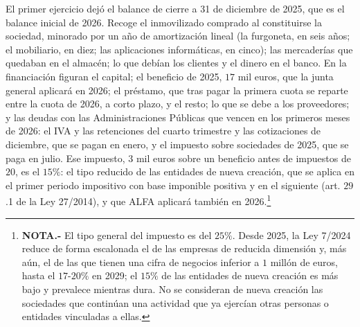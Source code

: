 \documentclass[10pt,a4paper]{article}
\begin{document}
El primer ejercicio dejó el balance de cierre a 31 de diciembre de 2025, que es el balance inicial de 2026. Recoge el inmovilizado comprado al constituirse la sociedad, minorado por un año de amortización lineal (la furgoneta, en seis años; el mobiliario, en diez; las aplicaciones informáticas, en cinco); las mercaderías que quedaban en el almacén; lo que debían los clientes y el dinero en el banco. En la financiación figuran el capital; el beneficio de 2025, $17$ mil euros, que la junta general aplicará en 2026; el préstamo, que tras pagar la primera cuota se reparte entre la cuota de 2026, a corto plazo, y el resto; lo que se debe a los proveedores; y las deudas con las Administraciones Públicas que vencen en los primeros meses de 2026: el IVA y las retenciones del cuarto trimestre y las cotizaciones de diciembre, que se pagan en enero, y el impuesto sobre sociedades de 2025, que se paga en julio. Ese impuesto, $3$ mil euros sobre un beneficio antes de impuestos de $20$, es el $15\%$: el tipo reducido de las entidades de nueva creación, que se aplica en el primer periodo impositivo con base imponible positiva y en el siguiente (art. $29$.1 de la Ley 27/2014), y que ALFA aplicará también en 2026.\footnote{%
    \textbf{NOTA.-} El tipo general del impuesto es del $25\%$. Desde 2025, la Ley 7/2024 reduce de forma escalonada el de las empresas de reducida dimensión y, más aún, el de las que tienen una cifra de negocios inferior a $1$ millón de euros, hasta el $17$-$20\%$ en 2029; el $15\%$ de las entidades de nueva creación es más bajo y prevalece mientras dura. No se consideran de nueva creación las sociedades que continúan una actividad que ya ejercían otras personas o entidades vinculadas a ellas.
}
\end{document}
